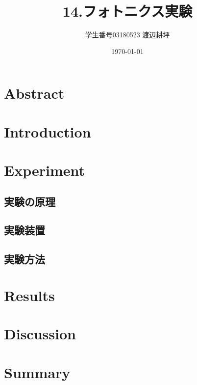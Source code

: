 \documentclass[titlepage]{jsarticle}
\title{14.フォトニクス実験}
\author{学生番号03180523 渡辺耕坪}
\date{\today}
\begin{document}
\maketitle

\begin{comment}
\begin{figure}[htbp]
 \begin{minipage}{0.5\hsize}
  \begin{center}
   \texttt{[image: ]}
  \end{center}
  \caption{}
  \label{}
 \end{minipage}
 \begin{minipage}{0.5\hsize}
  \begin{center}
   \texttt{[image: ]}
  \end{center}
  \caption{}
  \label{}
 \end{minipage}
\end{figure}
\end{comment}

\begin{comment}
\begin{figure}[htbp]
 \begin{minipage}{0.5\hsize}
  \begin{center}
   \texttt{[image: ]}
  \end{center}
  \caption{}
  \label{} \end{minipage}
\end{figure}
\end{comment}
\section{Abstract}
\section{Introduction}
\section{Experiment}
\subsection{実験の原理}
\subsection{実験装置}
\subsection{実験方法}
\section{Results}
\section{Discussion}
\section{Summary}


\begin{thebibliography}{9}
  \bibitem{}
  \bibitem{}
\end{thebibliography}
\end{document}
